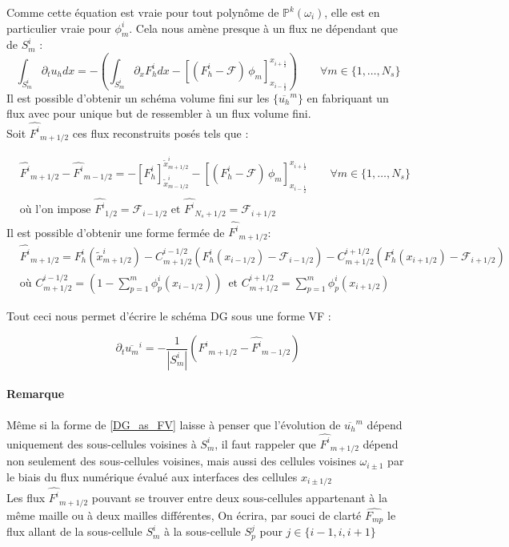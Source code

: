 Comme cette équation est vraie pour tout polynôme de $\mathbb{P}^k(\omega_i)$, elle est en particulier vraie pour $\phi_m^i$. Cela nous amène presque à un flux ne dépendant que de $S_m^i$ : 
\begin{equation}
    \int_{S_m^i} \partial_t {u_h} dx = - \left(\int_{S_m^i}  \partial_x {F}_h^i dx - \left[ ( {F}_h^i - \mathcal{F} )\, \phi_m \right]_{x_{i-\frac{1}{2}}}^{x_{i+\frac{1}{2}}}\right) \qquad \forall m\in \{ 1, \dots, N_s\}
\end{equation}
Il est possible d'obtenir un schéma volume fini sur les $\{\overline{{u}_h}^m\}$ en fabriquant un flux avec pour unique but de ressembler à un flux volume fini. \\
Soit $\widehat{{F}^i}_{m+1/2}$ ces flux reconstruits posés tels que : 

\begin{align}
&\widehat{{F}^i}_{m+1/2} - \widehat{{F}^i}_{m-1/2} =  -  \left[{F}_h^i\right]_{\tilde{x}^i_{m-1/2}}^{\tilde{x}^i_{m+1/2}}  - \left[ ( {F}_h^i - \mathcal{F} )\, \phi_m \right]_{x_{i-\frac{1}{2}}}^{x_{i+\frac{1}{2}}} \qquad \forall m\in \{ 1, \dots, N_s\} \\
& \text{où l'on impose  } \widehat{{F}^i}_{1/2} = \mathcal{F}_{i-1/2} \text{ et } \widehat{{F}^i}_{ N_s + 1/2} = \mathcal{F}_{i+1/2}
\end{align}
Il est possible d'obtenir une forme fermée de $\widehat{F^i}_{m+1/2}$: 
\begin{align}
    &\widehat{{F}^i}_{m+1/2} = {F}_h^i(\tilde{x}^i_{m+1/2}) 
    -C^{i-1/2}_{m+1/2} ( {F}_h^i(x_{i-1/2}) - \mathcal{F}_{i-1/2}) 
    -C^{i+1/2}_{m+1/2} ( {F}_h^i(x_{i+1/2}) - \mathcal{F}_{i+1/2}) \\
    & \text{où }  C^{i-1/2}_{m+1/2} = (1- \sum_{p=1}^{m}\phi_p^i(x_{i-1/2})) \, \text{ et }
        C^{i+1/2}_{m+1/2} =     \sum_{p=1}^{m}\phi_p^i(x_{i+1/2})
\end{align}

Tout ceci nous permet d'écrire le schéma DG sous une forme VF : 
 
\begin{equation}\label{DG_as_FV}
    \partial_t \overline{{u}_m}^i = -\frac{1}{|S_m^i|}(\widehat{{F}^i}_{m+1/2} - \widehat{{F}^i}_{m-1/2})
\end{equation}

\paragraph{Remarque \\}
\noindent Même si la forme de \eqref{DG_as_FV} laisse à penser que l'évolution de $\overline{{u_h}}^m$ 
dépend uniquement des sous-cellules voisines à $S_m^i$, 
il faut rappeler que $\widehat{{F}^i}_{m+1/2}$ dépend non seulement des sous-cellules voisines, 
mais aussi des cellules voisines $\omega_{i\pm1}$ par le biais du flux numérique évalué aux interfaces des cellules $x_{i\pm1/2}$ \\
Les flux $\widehat{{F}^i}_{m+1/2}$ pouvant se trouver entre deux sous-cellules appartenant à la même maille ou à deux mailles différentes, 
On écrira, par souci de clarté  $\widehat{{F}_{mp}}$ le flux allant de la sous-cellule $S_m^i$ à la sous-cellule $S_p^j$ pour $j\in \{i-1,i,i+1\}$ 

